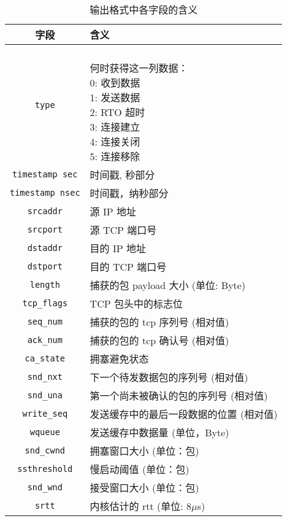 \documentclass{article}
\begin{document}
	\begin{table}[!ht]
		\centering
		\caption{输出格式中各字段的含义} \label{tab: field-description}
		\begin{tabular}{|c|l|} \hline
			{\bf 字段}	& {\centering \bf 含义} \\ \hline
			\texttt{type}	& \parbox{0.6\linewidth}{
				~\\
				何时获得这一列数据：\\
				0: 收到数据 \\
				1: 发送数据 \\
				2: RTO 超时 \\
				3: 连接建立 \\
				4: 连接关闭 \\
				5: 连接移除
			} \\ \hline
			\texttt{timestamp sec} 	& 时间戳, 秒部分 \\ \hline
			\texttt{timestamp nsec}	& 时间戳，纳秒部分 \\ \hline
			\texttt{srcaddr}	& 源 IP 地址 \\ \hline
			\texttt{srcport}	& 源 TCP 端口号 \\ \hline
			\texttt{dstaddr}	& 目的 IP 地址 \\ \hline
			\texttt{dstport}	& 目的 TCP 端口号  \\ \hline
			\texttt{length}		& 捕获的包 payload 大小 (单位: Byte) \\ \hline
			\texttt{tcp\_flags} & TCP 包头中的标志位 \\ \hline
			\texttt{seq\_num}	& 捕获的包的 tcp 序列号 (相对值) \\ \hline
			\texttt{ack\_num}	& 捕获的包的 tcp 确认号 (相对值) \\ \hline
			\texttt{ca\_state}	& 拥塞避免状态 \\ \hline
			\texttt{snd\_nxt}	& 下一个待发数据包的序列号 (相对值) \\ \hline
			\texttt{snd\_una}	& 第一个尚未被确认的包的序列号 (相对值) \\ \hline
			\texttt{write\_seq}	& 发送缓存中的最后一段数据的位置 (相对值) \\ \hline
			\texttt{wqueue}		& 发送缓存中数据量 (单位，Byte) \\ \hline
			\texttt{snd\_cwnd}	& 拥塞窗口大小 (单位：包) \\ \hline
			\texttt{ssthreshold} & 慢启动阈值 (单位：包) \\ \hline
			\texttt{snd\_wnd}	& 接受窗口大小 (单位：包) \\ \hline
			\texttt{srtt}		& 内核估计的 rtt (单位: 8$\mu$s) \\ \hline

\end{tabular}
\end{table}
\end{document}
